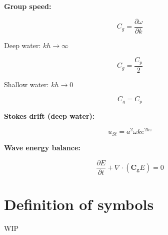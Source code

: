 \documentclass[12pt]{article}
\numberwithin{equation}{section}
\numberwithin{figure}{section}
\numberwithin{table}{section}
\begin{document}
\textbf{Group speed:}

\begin{equation}
  C_g = \frac{\partial \omega}{\partial k}
\end{equation}

Deep water: $kh \to \infty$

\begin{equation}
  C_g = \frac{C_p}{2}
\end{equation}

Shallow water: $kh \to 0$

\begin{equation}
  C_g = C_p
\end{equation}

\textbf{Stokes drift (deep water):}

\begin{equation}
  u_{St} = a^2 \omega k e^{2kz}
\end{equation}

\textbf{Wave energy balance:}

\begin{equation}
  \frac{\partial E}{\partial t} + \nabla \cdot \left( \mathbf{C_g} E \right) = 0
\end{equation}

\section{Definition of symbols}

WIP
\end{document}
